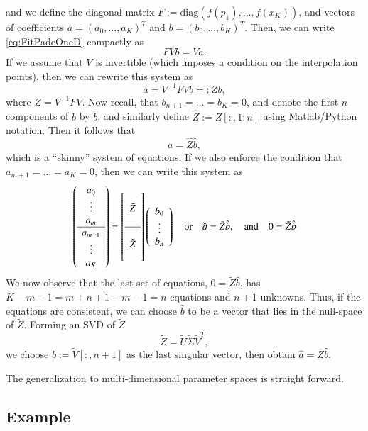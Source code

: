 and we define the diagonal matrix $F := \text{diag}(f(p_1), \ldots, f(x_K))$, and
vectors of coefficients $a=(a_0,\ldots,a_K)^T$ and $b=(b_0,\ldots,b_K)^T$. Then,
we can write \eqref{eq:FitPadeOneD} compactly as
\[ F V b = V a . \]
If we assume that $V$ is invertible (which imposes a condition on the interpolation points),
then we can rewrite this system as
\[ a = V^{-1} F V b =: Z b , \]
where $Z = V^{-1} F V$. Now recall, that $b_{n+1} = \ldots = b_K = 0$, and denote the first
$n$ components of $b$ by $\hat{b}$, and similarly define $\hat{Z} := Z[:,1:n]$ using Matlab/Python
notation. Then it follows that
\[ a = \hat{Z} \hat{b} ,\]
which is a ``skinny'' system of equations. If we also enforce the condition that
$a_{m+1} = \ldots = a_K = 0$, then we can write this system as
\[ \left(\begin{array}{c}
     a_0 \\ \vdots \\ a_m \\ \hline a_{m+1} \\ \vdots \\ a_K
   \end{array}\right)
   =
   \left[\begin{array}{c} \\ \bar{Z} \\ \\ \hline \\ \tilde{Z} \\ \phantom{+} \end{array}\right]
   \left(\begin{array}{c}
     b_0 \\ \vdots \\ b_n
   \end{array}\right)
   \quad \text{or}\quad \hat{a} = \bar{Z} \hat{b}, \quad \text{and} \quad 0 = \tilde{Z} \hat{b}
\]
We now observe that the last set of equations, $0 = \tilde{Z} \hat{b}$, has $K-m-1=m+n+1-m-1=n$ equations
and $n+1$ unknowns. Thus, if the equations are consistent, we can choose $\hat{b}$ to be a vector that
lies in the null-space of $\tilde{Z}$. Forming an SVD of $\tilde{Z}$
\[ \tilde{Z} = \tilde{U} \tilde{\Sigma} \tilde{V}^T ,\]
we choose $\hat{b} := \tilde{V}[:,n+1]$ as the last singular vector, then obtain $\hat{a} = \bar{Z} \hat{b}$.

The generalization to multi-dimensional parameter spaces is straight forward.


\subsection{Example}

